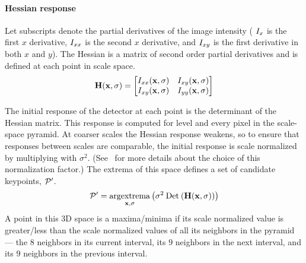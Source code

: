         \paragraph{Hessian response}
            Let subscripts denote the partial derivatives of the image intensity (\eg{} $I_{x}$ is the first $x$
            derivative, $I_{xx}$ is the second $x$ derivative, and $I_{xy}$ is the first derivative in both
            $x$ and $y$). The Hessian is a matrix of second order partial derivatives and is defined at each point
            in scale space.
            \begin{equation}
                \mathbf{H}(\mathbf{x}, \sigma) = 
                 \left[ \begin{matrix} 
                I_{xx}(\mathbf{x}, \sigma) & I_{xy}(\mathbf{x}, \sigma) \\
                I_{xy}(\mathbf{x}, \sigma) & I_{yy}(\mathbf{x}, \sigma)  \end{matrix} \right]  
            \end{equation}\label{eqn:hessianmatrix}  

            The initial response of the detector at each point is the determinant of the Hessian matrix. This
            response is computed for level and every pixel in the scale-space pyramid. At coarser scales the
            Hessian response weakens, so to ensure that responses between scales are comparable, the initial
            response is scale normalized by multiplying with $\sigma^2$. (See~\cite{lindeberg_feature_1998} for
            more details about the choice of this normalization factor.) The extrema of this space defines a set of
            candidate keypoints, $\mathcal{P}'$.
            \begin{equation}
                \mathcal{P}' = \underset{\mathbf{x},\sigma}{\operatorname{argextrema}} \left(\sigma^2 \mathbin{\textrm{Det}}\left(\mathbf{H}(\mathbf{x}, \sigma)\right)\right) 
            \end{equation}
            A point in this 3D space is a maxima/minima if its scale normalized value is greater/less than the
            scale normalized values of all its neighbors in the pyramid --- \ie{} the $8$ neighbors in its current
            interval, its $9$ neighbors in the next interval, and its $9$ neighbors in the previous interval.

